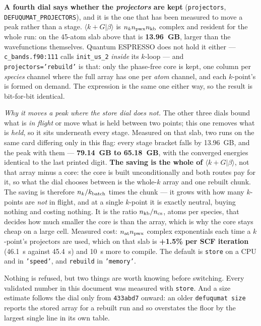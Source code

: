 \documentclass[11pt,a4paper]{article}
\newcommand{\qe}{Quantum ESPRESSO}
\newcommand{\code}[1]{\texttt{\small #1}}
\begin{document}
\textbf{A fourth dial says whether the \emph{projectors} are kept}
(\code{projectors}, \code{DEFUQUMAT\_PROJECTORS}), and it is the one that has been
measured to move a peak rather than a stage. $\langle k+G|\beta\rangle$ is
$n_k n_{\rm pwx} n_{\rm kb}$ complex and resident for the whole run: on the
45-atom slab above that is \textbf{13.96~GB}, larger than the wavefunctions
themselves. \qe{} does not hold it either --- \code{c\_bands.f90:111} calls
\code{init\_us\_2} \emph{inside} its $k$-loop --- and \code{projectors='rebuild'}
is that: only the phase-free core is kept, one column per \emph{species} channel
where the full array has one per \emph{atom} channel, and each $k$-point's is
formed on demand. The expression is the same one either way, so the result is
bit-for-bit identical.

\emph{Why it moves a peak where the store dial does not.} The other three dials
bound what is \emph{in flight} or move what is held between two points; this one
removes what is \emph{held}, so it sits underneath every stage. Measured on that
slab, two runs on the same card differing only in this flag: every stage bracket
falls by 13.96~GB, and the peak with them --- \textbf{79.14~GB to 65.18~GB},
with the converged energies identical to the last printed digit. \textbf{The
saving is the whole of $\langle k+G|\beta\rangle$}, not that array minus a core:
the core is built unconditionally and both routes pay for it, so what the dial
chooses between is the whole-$k$ array and one rebuilt chunk. The saving is
therefore $n_k/k_{\rm batch}$ times the chunk --- it grows with how many
$k$-points are \emph{not} in flight, and at a single $k$-point it is exactly
neutral, buying nothing and costing nothing. It is the ratio $n_{\rm kb}/n_{\rm
cs}$, atoms per species, that decides how much smaller the core is than the
array, which is why the core stays cheap on a large cell. Measured cost:
$n_{\rm at} n_{\rm pwx}$ complex exponentials each time a $k$-point's projectors
are used, which on that slab is \textbf{+1.5\% per SCF iteration} (46.1~s against
45.4~s) and 10~s more to compile. The default is \code{store} on a CPU and
in \code{'speed'}, and \code{rebuild} in \code{'memory'}.

\begin{refuses}
Nothing is refused, but two things are worth knowing before switching. Every
validated number in this document was measured with \code{store}. And a size
estimate follows the dial only from \code{433abd7} onward:
an older \code{defuqumat size} reports the stored array for a rebuilt run and so
overstates the floor by the largest single line in its own table.
\end{refuses}
\end{document}
